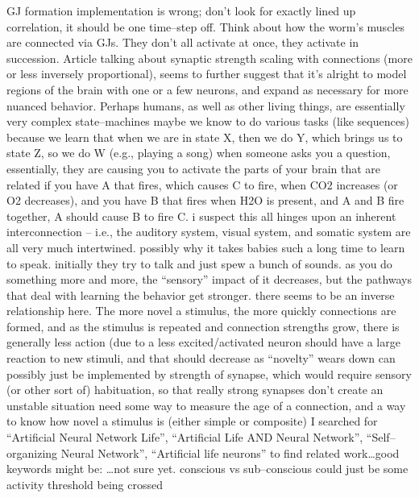 \documentclass[11pt, a4paper, oneside]{article}   	%
\begin{document}
\begin{outline}
\point GJ formation implementation is wrong; don't look for exactly lined up correlation, it should be one time--step off. Think about how the worm's muscles are connected via GJs. They don't all activate at once, they activate in succession.
\point Article talking about synaptic strength scaling with connections (more or less inversely proportional), seems to further suggest that it's alright to model regions of the brain with one or a few neurons, and expand as necessary for more nuanced behavior.
\point Perhaps humans, as well as other living things, are essentially very complex state--machines
    \subpoint maybe we know to do various tasks (like sequences) because we learn that when we are in state X, then we do Y, which brings us to state Z, so we do W (e.g., playing a song)
\point when someone asks you a question, essentially, they are causing you to activate the parts of your brain that are related 
\point if you have A that fires, which causes C to fire, when CO2 increases (or O2 decreases), and you have B that fires when H2O is present, and A and B fire together, A should cause B to fire C.
    \subpoint i suspect this all hinges upon an inherent interconnection  -- i.e., the auditory system, visual system, and somatic system are all very much intertwined.
        \subsubpoint possibly why it takes babies such a long time to learn to speak. initially they try to talk and just spew a bunch of sounds.
\point as you do something more and more, the ``sensory'' impact of it decreases, but the pathways that deal with learning the behavior get stronger.
    \subpoint there seems to be an inverse relationship here. The more novel a stimulus, the more quickly connections are formed, and as the stimulus is repeated and connection strengths grow, there is generally less action (due to a less excited/activated neuron
        \subsubpoint should have a large reaction to new stimuli, and that should decrease as ``novelty'' wears down
            \supersubpoint can possibly just be implemented by strength of synapse, which would require sensory (or other sort of) habituation, so that really strong synapses don't create an unstable situation
        \subsubpoint need some way to measure the age of a connection, and a way to know how novel a stimulus is (either simple or composite)
\point I searched for ``Artificial Neural Network Life'', ``Artificial Life AND Neural Network'', ``Self--organizing Neural Network'', ``Artificial life neurons'' to find related work\ldots good keywords might be:
    \subpoint \ldots not sure yet.
\point conscious vs sub--conscious could just be some activity threshold being crossed

\end{outline}
\end{document}
